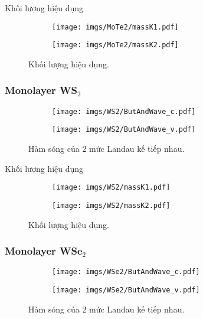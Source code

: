 \documentclass{article}
\begin{document}
Khối lượng hiệu dụng 
\begin{figure}[htb]
	\begin{subfigure}{0.495\textwidth}
		\centering
		\texttt{[image: imgs/MoTe2/massK1.pdf]}
	\end{subfigure}
	\begin{subfigure}{0.495\textwidth}
		\centering
		\texttt{[image: imgs/MoTe2/massK2.pdf]}
	\end{subfigure}
	\caption{Khối lượng hiệu dụng.}
\end{figure}

\newpage
\subsubsection*{Monolayer WS$_{2}$}
\begin{figure}[htb]
	\begin{subfigure}{0.495\textwidth}
		\centering
		\texttt{[image: imgs/WS2/ButAndWave\_c.pdf]}
	\end{subfigure}
	\begin{subfigure}{0.495\textwidth}
		\centering
		\texttt{[image: imgs/WS2/ButAndWave\_v.pdf]}
	\end{subfigure}
	\caption{Hàm sóng của 2 mức Landau kế tiếp nhau.}
\end{figure}

Khối lượng hiệu dụng 
\begin{figure}[htb]
	\begin{subfigure}{0.495\textwidth}
		\centering
		\texttt{[image: imgs/WS2/massK1.pdf]}
	\end{subfigure}
	\begin{subfigure}{0.495\textwidth}
		\centering
		\texttt{[image: imgs/WS2/massK2.pdf]}
	\end{subfigure}
	\caption{Khối lượng hiệu dụng.}
\end{figure}
\newpage
\subsubsection*{Monolayer WSe$_{2}$}
\begin{figure}[htb]
	\begin{subfigure}{0.495\textwidth}
		\centering
		\texttt{[image: imgs/WSe2/ButAndWave\_c.pdf]}
	\end{subfigure}
	\begin{subfigure}{0.495\textwidth}
		\centering
		\texttt{[image: imgs/WSe2/ButAndWave\_v.pdf]}
	\end{subfigure}
	\caption{Hàm sóng của 2 mức Landau kế tiếp nhau.}
\end{figure}
\end{document}
